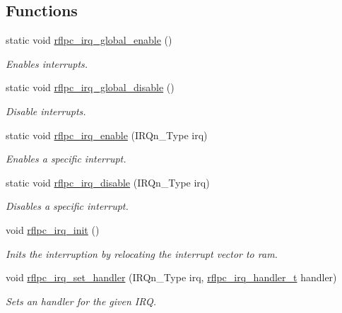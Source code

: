 \subsection*{Functions}
\begin{DoxyCompactItemize}
\item 
static void \hyperlink{group__irq_ga8ea383f190fd09d12cb5877bbad1f5a4}{rflpc\-\_\-irq\-\_\-global\-\_\-enable} ()
\begin{DoxyCompactList}\small\item\em Enables interrupts. \end{DoxyCompactList}\item 
static void \hyperlink{group__irq_ga82af8d1796028ae92eeee92b3b6127ce}{rflpc\-\_\-irq\-\_\-global\-\_\-disable} ()
\begin{DoxyCompactList}\small\item\em Disable interrupts. \end{DoxyCompactList}\item 
static void \hyperlink{group__irq_ga01316ea467ff4f3569f0d87231aa33b9}{rflpc\-\_\-irq\-\_\-enable} (I\-R\-Qn\-\_\-\-Type irq)
\begin{DoxyCompactList}\small\item\em Enables a specific interrupt. \end{DoxyCompactList}\item 
static void \hyperlink{group__irq_ga7d6587b57215a97c4d371152a61fda61}{rflpc\-\_\-irq\-\_\-disable} (I\-R\-Qn\-\_\-\-Type irq)
\begin{DoxyCompactList}\small\item\em Disables a specific interrupt. \end{DoxyCompactList}\item 
void \hyperlink{group__irq_gabae98defc31aa4c4296d06f9f0fe8340}{rflpc\-\_\-irq\-\_\-init} ()
\begin{DoxyCompactList}\small\item\em Inits the interruption by relocating the interrupt vector to ram. \end{DoxyCompactList}\item 
\hypertarget{group__irq_ga673c9a37d0577553390d3bc9828b0300}{void \hyperlink{group__irq_ga673c9a37d0577553390d3bc9828b0300}{rflpc\-\_\-irq\-\_\-set\-\_\-handler} (I\-R\-Qn\-\_\-\-Type irq, \hyperlink{group__irq_ga4970a8a2cf9b63e4c261982504669a1f}{rflpc\-\_\-irq\-\_\-handler\-\_\-t} handler)}\label{group__irq_ga673c9a37d0577553390d3bc9828b0300}

\begin{DoxyCompactList}\small\item\em Sets an handler for the given I\-R\-Q. \end{DoxyCompactList}\end{DoxyCompactItemize}


